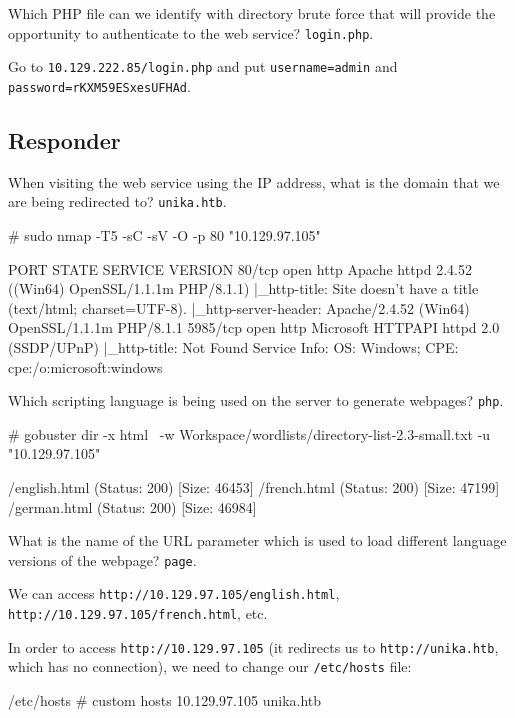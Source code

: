 \documentclass[a4paper,10pt]{article}
\begin{document}
Which PHP file can we identify with directory brute force that will provide the opportunity to authenticate to the web service? \texttt{login.php}.

Go to \texttt{10.129.222.85/login.php} and put \texttt{username=admin} and \texttt{password=rKXM59ESxesUFHAd}.

\subsection{Responder \faWindows}

When visiting the web service using the IP address, what is the domain that we are being redirected to? \texttt{unika.htb}.
\begin{session}
# sudo nmap -T5 -sC -sV -O -p 80 "10.129.97.105"
\end{session}
\begin{txt}
PORT   STATE SERVICE VERSION
80/tcp open  http    Apache httpd 2.4.52 ((Win64) OpenSSL/1.1.1m PHP/8.1.1)
|_http-title: Site doesn't have a title (text/html; charset=UTF-8).
|_http-server-header: Apache/2.4.52 (Win64) OpenSSL/1.1.1m PHP/8.1.1
5985/tcp open  http    Microsoft HTTPAPI httpd 2.0 (SSDP/UPnP)
|_http-title: Not Found
Service Info: OS: Windows; CPE: cpe:/o:microsoft:windows
\end{txt}

Which scripting language is being used on the server to generate webpages? \texttt{php}.
\begin{session}
# gobuster dir -x html \
-w Workspace/wordlists/directory-list-2.3-small.txt -u "10.129.97.105"
\end{session}
\begin{bash}
/english.html         (Status: 200) [Size: 46453]
/french.html          (Status: 200) [Size: 47199]
/german.html          (Status: 200) [Size: 46984]
\end{bash}

What is the name of the URL parameter which is used to load different language versions of the webpage? \texttt{page}.

We can access \texttt{http://10.129.97.105/english.html}, \texttt{http://10.129.97.105/french.html}, etc.

In order to access \texttt{http://10.129.97.105} (it redirects us to \texttt{http://unika.htb}, which has no connection), we need to change our \texttt{/etc/hosts} file:
\begin{bash}
/etc/hosts
# custom hosts
10.129.97.105   unika.htb
\end{bash}
\end{document}
